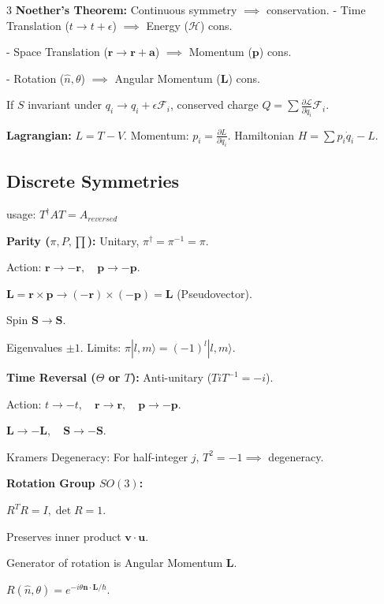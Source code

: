 \documentclass[10pt,a4paper]{article}
\begin{document}
\begin{multicols*}{3}
\textbf{Noether's Theorem:} Continuous symmetry $\implies$ conservation.
- Time Translation ($t \to t+\epsilon$) $\implies$ Energy ($\mathcal{H}$) cons.

- Space Translation ($\mathbf{r} \to \mathbf{r}+\mathbf{a}$) $\implies$ Momentum ($\mathbf{p}$) cons.

- Rotation ($\hat{n}, \theta$) $\implies$ Angular Momentum ($\mathbf{L}$) cons.

If $S$ invariant under $q_i \to q_i + \epsilon \mathcal{F}_i$, conserved charge $Q = \sum \frac{\partial \mathcal{L}}{\partial \dot{q}_i} \mathcal{F}_i$.

\textbf{Lagrangian:} $L = T - V$. Momentum: $p_i = \frac{\partial L}{\partial \dot{q}_i}$.
Hamiltonian $H = \sum p_i \dot{q}_i - L$.


\subsection*{Discrete Symmetries}

usage: $T^\dagger A T=A_{reversed}$

\textbf{Parity ($\pi, P, \prod$):} Unitary, $\pi^\dagger = \pi^{-1} = \pi$.

Action: $\mathbf{r} \to -\mathbf{r}, \quad \mathbf{p} \to -\mathbf{p}$.

$\mathbf{L} = \mathbf{r} \times \mathbf{p} \to (-\mathbf{r}) \times (-\mathbf{p}) = \mathbf{L}$ (Pseudovector).

Spin $\mathbf{S} \to \mathbf{S}$.

Eigenvalues $\pm 1$. Limits: $\pi |l,m\rangle = (-1)^l |l,m\rangle$.

\textbf{Time Reversal ($\Theta$ or $T$):} Anti-unitary ($T i T^{-1} = -i$).

Action: $t \to -t, \quad \mathbf{r} \to \mathbf{r}, \quad \mathbf{p} \to -\mathbf{p}$.

$\mathbf{L} \to -\mathbf{L}, \quad \mathbf{S} \to -\mathbf{S}$.

Kramers Degeneracy: For half-integer $j$, $T^2 = -1 \implies$ degeneracy.

\textbf{Rotation Group $SO(3)$:} 

$R^T R = I, \det R = 1$.

Preserves inner product $\mathbf{v} \cdot \mathbf{u}$.

Generator of rotation is Angular Momentum $\mathbf{L}$.

$R(\hat{n}, \theta) = e^{-i \theta \mathbf{n} \cdot \mathbf{L} / \hbar}$.


\end{multicols*}
\end{document}
